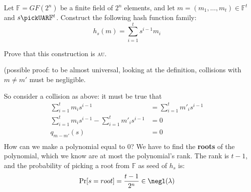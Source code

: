\begin{exercise}
    Let $\mathbb{F} = GF(2^n)$ be a finite field of $2^n$ elements, and let $m = (m_1, \dots, m_t) \in \mathbb{F}^t$ and $s \pickUAR \mathbb{F}^t$. Construct the following hash function family:
    \[
        h_{s}(m) = \sum_{i=1}^{t}s^{i-1}m_{i}
    \]

    Prove that this construction is \textsc{au}.
\end{exercise}

\begin{solution}
    (possible proof: to be almost universal, looking at the definition, collisions with $m \not= m'$ must be negligible.

    So consider a collision as above: it must be true that  
    \begin{align*}
        \sum_{i=1}^{t} m_{i}s^{i-1}                                 &= \sum_{i=1}^{t} m'_{i}s^{i-1} \\ 
        \sum_{i=1}^{t} m_{i}s^{i-1}-\sum_{i=1}^{t} m'_{i}s^{i-1}    &= 0                            \\
        q_{m-m'}(s)                                                 &= 0                            \\
    \end{align*}
    How can we make a polynomial equal to 0? We have to find the \textbf{roots} of the polynomial, which we know are at most the polynomial's rank. The rank is $t - 1$, and the probability of picking a root from $\mathbb{F}$ as seed of $h_s$ is:
    \[
        \Pr[s=root] = \frac{t - 1}{2^{n}} \in \negl(\lambda)
    \]
\end{solution}
 
